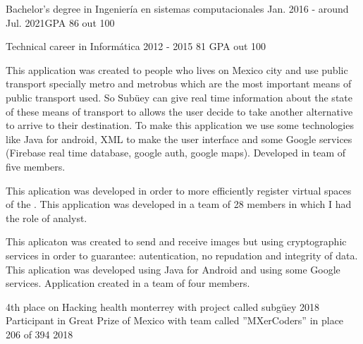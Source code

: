 \documentclass{resume}
\begin{document}

{Bachelor's degree in Ingeniería en sistemas computacionales}
{Jan. 2016 - around Jul. 2021}{GPA 86 out 100}\break

{Technical career in Informática}
{2012 - 2015}
{81 GPA out 100}

{This application was created to people who lives on Mexico city and use public transport specially metro and metrobus which are the most important means of public transport used. So Subüey can give real time information about the state of these means of transport to allows the user decide to take another alternative to arrive to their destination. To make this application we use some technologies like Java for android, XML to make the user interface and some Google services (Firebase real time database, google auth, google maps). Developed in team of five members.}

{This aplication was developed in order to more efficiently register virtual spaces of the . This application was developed in a team of 28 members in which I had the role of analyst.}

{This aplicaton was created to send and receive images but using cryptographic services in order to guarantee: autentication, no repudation and integrity of data. This aplication was developed using Java for Android and using some Google services. Application created in a team of four members.}

{4th place on Hacking health monterrey with project called subgüey}
{2018}
{Participant in Great Prize of Mexico with team called ''MXerCoders'' in place 206 of 394}
{2018}
\end{document}
